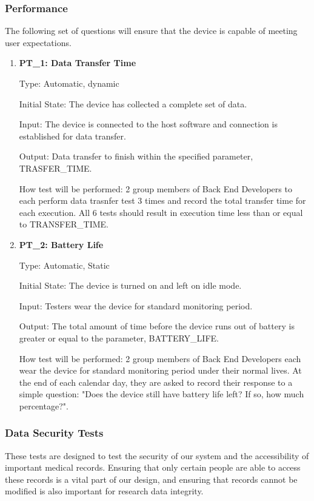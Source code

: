 \documentclass[12pt, titlepage]{article}
\begin{document}
\subsubsection{Performance}
The following set of questions will ensure that the device is capable of meeting user expectations.
\begin{enumerate}
\item\textbf{{PT\_1: Data Transfer Time\\}}\label{PT1}

Type: Automatic, dynamic
					
Initial State: The device has collected a complete set of data.
					
Input: The device is connected to the host software and connection is established for data transfer.
					
Output: Data transfer to finish within the specified parameter, TRASFER\_TIME.
					
How test will be performed: 2 group members of Back End Developers to each perform data trasnfer test 3 times and record the total transfer time for each execution. All 6 tests should result in execution time less than or equal to TRANSFER\_TIME.

\item\textbf{{PT\_2: Battery Life\\}}\label{PT2}

Type: Automatic, Static
					
Initial State: The device is turned on and left on idle mode.
					
Input: Testers wear the device for standard monitoring period.
					
Output: The total amount of time before the device runs out of battery is greater or equal to the parameter, BATTERY\_LIFE.
					
How test will be performed: 2 group members of Back End Developers each wear the device for standard monitoring period under their normal lives. At the end of each calendar day, they are asked to record their response to a simple question: "Does the device still have battery life left? If so, how much percentage?". 

\end{enumerate}

\subsubsection{Data Security Tests}

These tests are designed to test the security of our system and the accessibility of important medical records. Ensuring that only certain people are able to access these records is a vital part of our design, and ensuring that records cannot be modified is also important for research data integrity. 
\end{document}
